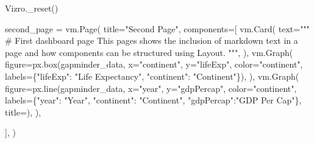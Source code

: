 \documentclass[
  letterpaper,
  DIV=11,
  numbers=noendperiod]{scrreprt}
\newenvironment{Shaded}{\begin{snugshade}}{\end{snugshade}}
\newcommand{\NormalTok}[1]{\textcolor[rgb]{0.00,0.23,0.31}{#1}}
\newcommand{\OperatorTok}[1]{\textcolor[rgb]{0.37,0.37,0.37}{#1}}
\newcommand{\StringTok}[1]{\textcolor[rgb]{0.13,0.47,0.30}{#1}}
\begin{document}
\begin{Shaded}
\begin{Highlighting}[]
\NormalTok{Vizro.\_reset()}

\NormalTok{second\_page }\OperatorTok{=}\NormalTok{ vm.Page(}
\NormalTok{    title}\OperatorTok{=}\StringTok{"Second Page"}\NormalTok{,}
\NormalTok{    components}\OperatorTok{=}\NormalTok{[}
\NormalTok{        vm.Card(}
\NormalTok{            text}\OperatorTok{=}\StringTok{"""}
\StringTok{                \# First dashboard page}
\StringTok{                This pages shows the inclusion of markdown text in a page and how components}
\StringTok{                can be structured using Layout.}
\StringTok{            """}\NormalTok{,}
\NormalTok{        ),}
\NormalTok{        vm.Graph(}
\NormalTok{            figure}\OperatorTok{=}\NormalTok{px.box(gapminder\_data, x}\OperatorTok{=}\StringTok{"continent"}\NormalTok{, y}\OperatorTok{=}\StringTok{"lifeExp"}\NormalTok{, color}\OperatorTok{=}\StringTok{"continent"}\NormalTok{,}
\NormalTok{                            labels}\OperatorTok{=}\NormalTok{\{}\StringTok{"lifeExp"}\NormalTok{: }\StringTok{"Life Expectancy"}\NormalTok{, }\StringTok{"continent"}\NormalTok{: }\StringTok{"Continent"}\NormalTok{\}),}
\NormalTok{        ),}
\NormalTok{        vm.Graph(}
\NormalTok{            figure}\OperatorTok{=}\NormalTok{px.line(gapminder\_data, x}\OperatorTok{=}\StringTok{"year"}\NormalTok{, y}\OperatorTok{=}\StringTok{"gdpPercap"}\NormalTok{, color}\OperatorTok{=}\StringTok{"continent"}\NormalTok{,}
\NormalTok{                            labels}\OperatorTok{=}\NormalTok{\{}\StringTok{"year"}\NormalTok{: }\StringTok{"Year"}\NormalTok{, }\StringTok{"continent"}\NormalTok{: }\StringTok{"Continent"}\NormalTok{,}
                            \StringTok{"gdpPercap"}\NormalTok{:}\StringTok{"GDP Per Cap"}\NormalTok{\}, title}\OperatorTok{=}\StringTok{\textquotesingle{}\textquotesingle{}}\NormalTok{),}
\NormalTok{        ),}

\NormalTok{    ],}
\NormalTok{)}


\end{Highlighting}
\end{Shaded}
\end{document}
